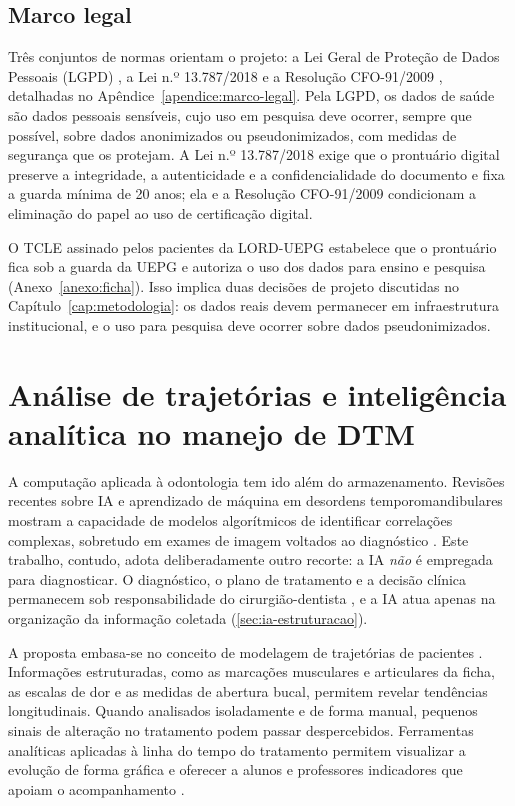 \subsection{Marco legal}
\label{sec:marco-legal}

Três conjuntos de normas orientam o projeto: a Lei Geral de Proteção de Dados Pessoais (LGPD) \cite{lgpd2018}, a Lei n.º 13.787/2018 \cite{lei13787} e a Resolução CFO-91/2009 \cite{cfo91-2009}, detalhadas no Apêndice~\ref{apendice:marco-legal}. Pela LGPD, os dados de saúde são dados pessoais sensíveis, cujo uso em pesquisa deve ocorrer, sempre que possível, sobre dados anonimizados ou pseudonimizados, com medidas de segurança que os protejam. A Lei n.º 13.787/2018 exige que o prontuário digital preserve a integridade, a autenticidade e a confidencialidade do documento e fixa a guarda mínima de 20 anos; ela e a Resolução CFO-91/2009 condicionam a eliminação do papel ao uso de certificação digital.

O TCLE assinado pelos pacientes da LORD-UEPG estabelece que o prontuário fica sob a guarda da UEPG e autoriza o uso dos dados para ensino e pesquisa (Anexo~\ref{anexo:ficha}). Isso implica duas decisões de projeto discutidas no Capítulo~\ref{cap:metodologia}: os dados reais devem permanecer em infraestrutura institucional, e o uso para pesquisa deve ocorrer sobre dados pseudonimizados.

\section{Análise de trajetórias e inteligência analítica no manejo de DTM}

A computação aplicada à odontologia tem ido além do armazenamento. Revisões recentes sobre IA e aprendizado de máquina em desordens temporomandibulares mostram a capacidade de modelos algorítmicos de identificar correlações complexas, sobretudo em exames de imagem voltados ao diagnóstico \cite{mehta2025,wu2025}. Este trabalho, contudo, adota deliberadamente outro recorte: a IA \emph{não} é empregada para diagnosticar. O diagnóstico, o plano de tratamento e a decisão clínica permanecem sob responsabilidade do cirurgião-dentista \cite{cfo118-2012}, e a IA atua apenas na organização da informação coletada (\autoref{sec:ia-estruturacao}).

A proposta embasa-se no conceito de modelagem de trajetórias de pacientes \cite{silva2022}. Informações estruturadas, como as marcações musculares e articulares da ficha, as escalas de dor e as medidas de abertura bucal, permitem revelar tendências longitudinais. Quando analisados isoladamente e de forma manual, pequenos sinais de alteração no tratamento podem passar despercebidos. Ferramentas analíticas aplicadas à linha do tempo do tratamento permitem visualizar a evolução de forma gráfica e oferecer a alunos e professores indicadores que apoiam o acompanhamento \cite{allam2021}.

